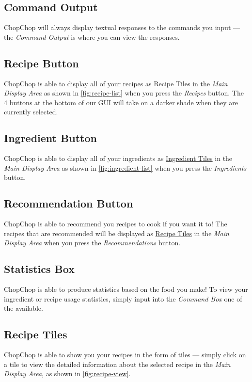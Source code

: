 \hypertarget{CommandOutput}{}
\subsection{Command Output}
	ChopChop will always display textual responses to the commands you input — the \emph{Command Output} is where you can view
	the responses.


\hypertarget{RecipeButton}{}
\subsection{Recipe Button}
	ChopChop is able to display all of your recipes as \hyperlink{RecipeTiles}{Recipe Tiles} in the \emph{Main Display Area} as shown in
	\autoref{fig:recipe-list} when you press the \emph{Recipes} button. The 4 buttons at the bottom of our GUI will take on a darker
	shade when they are currently selected.


\hypertarget{IngredientButton}{}
\subsection{Ingredient Button}
	ChopChop is able to display all of your ingredients as \hyperlink{IngredientTiles}{Ingredient Tiles} in the \emph{Main Display Area} as
	shown in \autoref{fig:ingredient-list} when you press the \emph{Ingredients} button.


\hypertarget{RecommendationButton}{}
\subsection{Recommendation Button}
	ChopChop is able to recommend you recipes to cook if you want it to! The recipes that are recommended will be displayed as
	\hyperlink{RecipeTiles}{Recipe Tiles} in the \emph{Main Display Area} when you press the \emph{Recommendations} button.


\hypertarget{StatisticsBox}{}
\subsection{Statistics Box}
	ChopChop is able to produce statistics based on the food you make! To view your ingredient or recipe usage statistics, simply
	input into the \emph{Command Box} one of the \hyperlink{GroupStatsCommands}{} available.


\hypertarget{RecipeTiles}{}
\subsection{Recipe Tiles}
	ChopChop is able to show you your recipes in the form of tiles — simply click on a tile to view the detailed information about
	the selected recipe in the \emph{Main Display Area}, as shown in \autoref{fig:recipe-view}.


